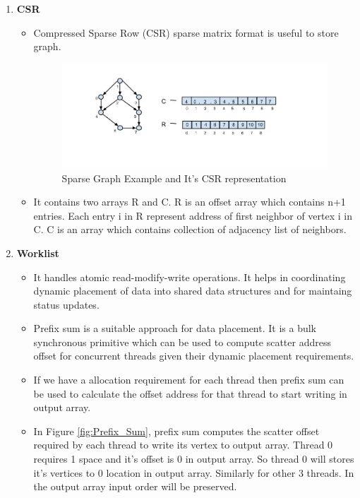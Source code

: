 \documentclass{article}
\begin{document}
\begin{enumerate}
\item \textbf{ CSR } \hfill \\
\begin{itemize}
\item Compressed Sparse Row (CSR) sparse matrix format is useful to store graph. \\

\begin{figure}
   \centering
   \includegraphics[width=7.0in]{CSR}
   \caption{Sparse Graph Example and It's CSR representation}
   \label{fig:CSR}
\end{figure}


\item It contains two arrays R and C. R is an offset array which contains n+1 entries. Each entry i in R represent address of first neighbor of vertex i in C. C is an array which contains collection of adjacency list of neighbors. \\
\end{itemize}

\item \textbf{ Worklist } \hfill \\

\begin{itemize}
\item It handles atomic read-modify-write operations. It helps in coordinating dynamic placement of data into shared data structures and for maintaing status updates. \\
\item Prefix sum is a suitable approach for data placement. It is a bulk synchronous primitive which can be used to compute scatter address offset for concurrent threads given their dynamic placement requirements. \\
\item If we have a allocation requirement for each thread then prefix sum can be used to calculate the offset address for that thread to start writing in output array. \\
\item In Figure \ref{fig:Prefix_Sum}, prefix sum computes the scatter offset required by each thread to write its vertex to output array. Thread 0 requires 1 space and it's offset is 0 in output array. So thread 0 will stores it's vertices to 0 location in output array. Similarly for other 3 threads. In the output array input order will be preserved. \\


\end{itemize}
\end{enumerate}
\end{document}
